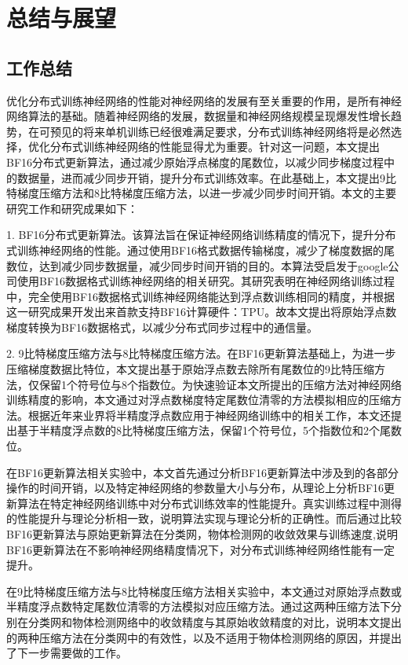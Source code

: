 \chapter{总结与展望}
\section{工作总结}
优化分布式训练神经网络的性能对神经网络的发展有至关重要的作用，是所有神经网络算法的基础。随着神经网络的发展，数据量和神经网络规模呈现爆发性增长趋势，在可预见的将来单机训练已经很难满足要求，分布式训练神经网络将是必然选择，优化分布式训练神经网络的性能显得尤为重要。针对这一问题，本文提出BF16分布式更新算法，通过减少原始浮点梯度的尾数位，以减少同步梯度过程中的数据量，进而减少同步开销，提升分布式训练效率。在此基础上，本文提出9比特梯度压缩方法和8比特梯度压缩方法，以进一步减少同步时间开销。本文的主要研究工作和研究成果如下：

1. BF16分布式更新算法。该算法旨在保证神经网络训练精度的情况下，提升分布式训练神经网络的性能。通过使用BF16格式数据传输梯度，减少了梯度数据的尾数位，达到减少同步数据量，减少同步时间开销的目的。本算法受启发于google公司使用BF16数据格式训练神经网络的相关研究。其研究表明在神经网络训练过程中，完全使用BF16数据格式训练神经网络能达到浮点数训练相同的精度，并根据这一研究成果开发出来首款支持BF16计算硬件：TPU。故本文提出将原始浮点数梯度转换为BF16数据格式，以减少分布式同步过程中的通信量。

2. 9比特梯度压缩方法与8比特梯度压缩方法。在BF16更新算法基础上，为进一步压缩梯度数据比特位，本文提出基于原始浮点数去除所有尾数位的9比特压缩方法，仅保留1个符号位与8个指数位。为快速验证本文所提出的压缩方法对神经网络训练精度的影响，本文通过对浮点数梯度特定尾数位清零的方法模拟相应的压缩方法。根据近年来业界将半精度浮点数应用于神经网络训练中的相关工作，本文还提出基于半精度浮点数的8比特梯度压缩方法，保留1个符号位，5个指数位和2个尾数位。

在BF16更新算法相关实验中，本文首先通过分析BF16更新算法中涉及到的各部分操作的时间开销，以及特定神经网络的参数量大小与分布，从理论上分析BF16更新算法在特定神经网络训练中对分布式训练效率的性能提升。真实训练过程中测得的性能提升与理论分析相一致，说明算法实现与理论分析的正确性。而后通过比较BF16更新算法与原始更新算法在分类网，物体检测网的收敛效果与训练速度,说明BF16更新算法在不影响神经网络精度情况下，对分布式训练神经网络性能有一定提升。

在9比特梯度压缩方法与8比特梯度压缩方法相关实验中，本文通过对原始浮点数或半精度浮点数特定尾数位清零的方法模拟对应压缩方法。通过这两种压缩方法下分别在分类网和物体检测网络中的收敛精度与其原始收敛精度的对比，说明本文提出的两种压缩方法在分类网中的有效性，以及不适用于物体检测网络的原因，并提出了下一步需要做的工作。
